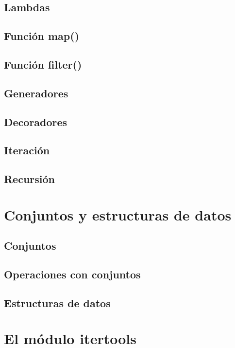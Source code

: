 \documentclass{article}
\begin{document}
\subsection{Lambdas}

\subsection{Función map()}

\subsection{Función filter()}

\subsection{Generadores}

\subsection{Decoradores}

\subsection{Iteración}

\subsection{Recursión}

\newpage\section{Conjuntos y estructuras de datos}

\subsection{Conjuntos}

\subsection{Operaciones con conjuntos}

\subsection{Estructuras de datos}

\newpage\section{El módulo itertools}
\end{document}

